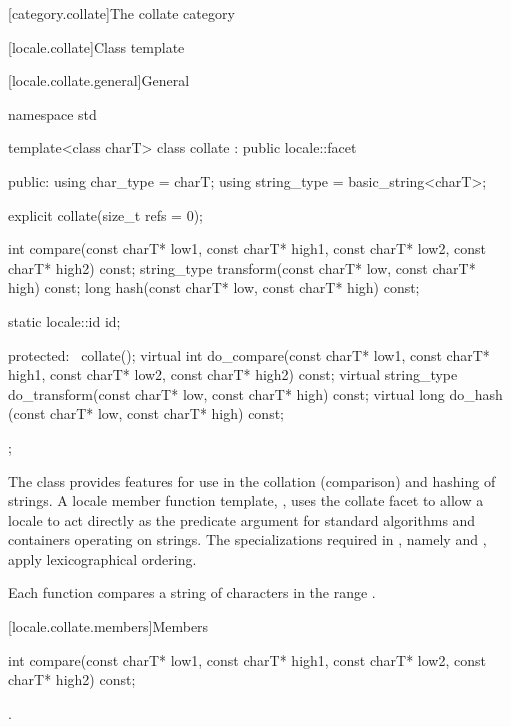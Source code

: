 [category.collate]{The collate category}

[locale.collate]{Class template }

[locale.collate.general]{General}

%
\begin{codeblock}
namespace std {
  template<class charT>
    class collate : public locale::facet {
    public:
      using char_type   = charT;
      using string_type = basic_string<charT>;

      explicit collate(size_t refs = 0);

      int compare(const charT* low1, const charT* high1,
                  const charT* low2, const charT* high2) const;
      string_type transform(const charT* low, const charT* high) const;
      long hash(const charT* low, const charT* high) const;

      static locale::id id;

    protected:
      ~collate();
      virtual int do_compare(const charT* low1, const charT* high1,
                             const charT* low2, const charT* high2) const;
      virtual string_type do_transform(const charT* low, const charT* high) const;
      virtual long do_hash (const charT* low, const charT* high) const;
    };
}
\end{codeblock}

\pnum
The class  provides features
for use in the collation (comparison) and hashing of strings.
A locale member function template, ,
uses the collate facet to allow a locale to act directly as
the predicate argument for standard algorithms and
containers operating on strings.
The specializations
required in ,
namely  and ,
apply lexicographical ordering.

\pnum
Each function compares a string of characters 
in the range .

[locale.collate.members]{Members}

%
\begin{itemdecl}
int compare(const charT* low1, const charT* high1,
            const charT* low2, const charT* high2) const;
\end{itemdecl}

\begin{itemdescr}
\pnum
\returns
{}.
\end{itemdescr}

